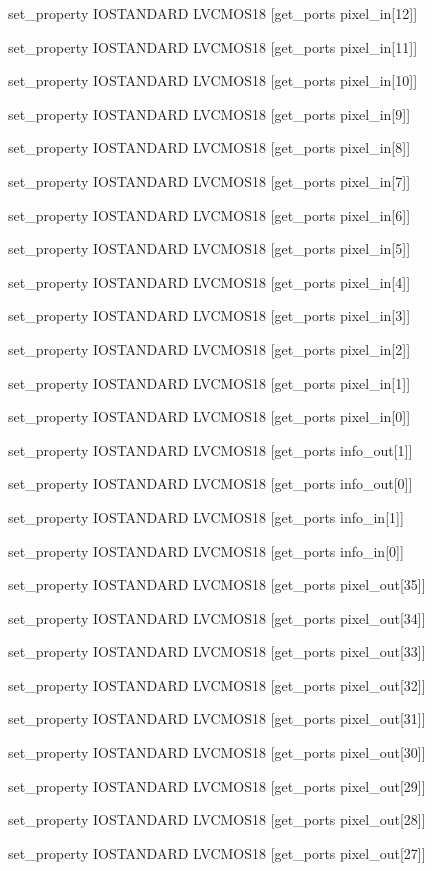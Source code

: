 set\_property IOSTANDARD LVCMOS18 [get\_ports {pixel\_in[12]}]

set\_property IOSTANDARD LVCMOS18 [get\_ports {pixel\_in[11]}]

set\_property IOSTANDARD LVCMOS18 [get\_ports {pixel\_in[10]}]

set\_property IOSTANDARD LVCMOS18 [get\_ports {pixel\_in[9]}]

set\_property IOSTANDARD LVCMOS18 [get\_ports {pixel\_in[8]}]

set\_property IOSTANDARD LVCMOS18 [get\_ports {pixel\_in[7]}]

set\_property IOSTANDARD LVCMOS18 [get\_ports {pixel\_in[6]}]

set\_property IOSTANDARD LVCMOS18 [get\_ports {pixel\_in[5]}]

set\_property IOSTANDARD LVCMOS18 [get\_ports {pixel\_in[4]}]

set\_property IOSTANDARD LVCMOS18 [get\_ports {pixel\_in[3]}]

set\_property IOSTANDARD LVCMOS18 [get\_ports {pixel\_in[2]}]

set\_property IOSTANDARD LVCMOS18 [get\_ports {pixel\_in[1]}]

set\_property IOSTANDARD LVCMOS18 [get\_ports {pixel\_in[0]}]

set\_property IOSTANDARD LVCMOS18 [get\_ports {info\_out[1]}]

set\_property IOSTANDARD LVCMOS18 [get\_ports {info\_out[0]}]

set\_property IOSTANDARD LVCMOS18 [get\_ports {info\_in[1]}]

set\_property IOSTANDARD LVCMOS18 [get\_ports {info\_in[0]}]

set\_property IOSTANDARD LVCMOS18 [get\_ports {pixel\_out[35]}]

set\_property IOSTANDARD LVCMOS18 [get\_ports {pixel\_out[34]}]

set\_property IOSTANDARD LVCMOS18 [get\_ports {pixel\_out[33]}]

set\_property IOSTANDARD LVCMOS18 [get\_ports {pixel\_out[32]}]

set\_property IOSTANDARD LVCMOS18 [get\_ports {pixel\_out[31]}]

set\_property IOSTANDARD LVCMOS18 [get\_ports {pixel\_out[30]}]

set\_property IOSTANDARD LVCMOS18 [get\_ports {pixel\_out[29]}]

set\_property IOSTANDARD LVCMOS18 [get\_ports {pixel\_out[28]}]

set\_property IOSTANDARD LVCMOS18 [get\_ports {pixel\_out[27]}]

